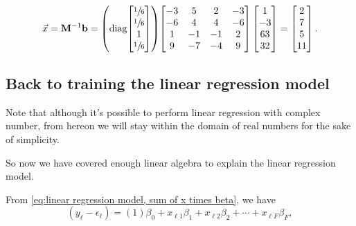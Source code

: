 \documentclass{article}
\begin{document}
\begin{equation}
    \vec{x} = \mathbf{M}^{-1}\mathbf{b} = \left(
        \operatorname{diag}\!\left[
            \begin{matrix}
                \sfrac16 \\* \sfrac16 \\* 1 \\* \sfrac16 \\*
            \end{matrix}
        \right]
    \right)\!\left[
        \begin{matrix}
            { -3} & {  5} & { 2} & {-3} \\*
            { -6} & {  4} & { 4} & {-6} \\*
            {  1} &   -1  &  -1  &   2  \\*
            {  9} & {-7} & {-4} & { 9} \\*
        \end{matrix}
    \right]\left[
        \begin{matrix}
            1 \\* -3 \\* 63 \\* 32 \\*
        \end{matrix}
    \right] = \left[
        \begin{matrix}
            2 \\* 7 \\* 5 \\* 11 \\*
        \end{matrix}
    \right].
\end{equation}

\subsection{Back to training the linear regression model}

Note that although it's possible to perform linear regression with complex number, from hereon we will stay within the domain of real numbers for the sake of simplicity.

So now we have covered enough linear algebra to explain the linear regression model.

From \eqref{eq:linear regression model, sum of x times beta}, we have
\begin{equation}
    (y_\ell - \epsilon_\ell) = (1)\beta_0 + x_{\ell1}\beta_1 + x_{\ell2}\beta_2 + \cdots + x_{\ell F}\beta_F,
\end{equation}
\end{document}
